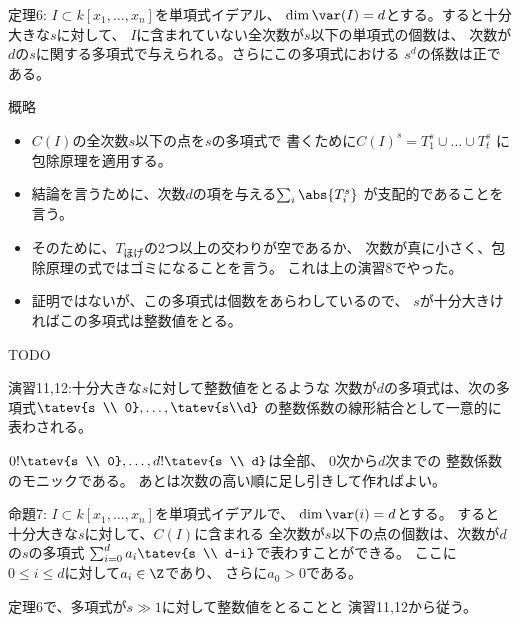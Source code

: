 \begin{framed}
  定理6:
  $I\subset k[x_1,\dots,x_n]$を単項式イデアル、
  $\dim \var(I) = d$とする。すると十分大きな$s$に対して、
  $I$に含まれていない全次数が$s$以下の単項式の個数は、
  次数が$d$の$s$に関する多項式で与えられる。さらにこの多項式における
  $s^d$の係数は正である。
\end{framed}
\begin{myproof}
  概略
  \begin{itemize}
    \item $C(I)$の全次数$s$以下の点を$s$の多項式で
    書くために$C(I)^s = T_1^s \cup \dots \cup T_t^s$
    に包除原理を適用する。
    \item 結論を言うために、次数$d$の項を与える$\sum_i \abs{T_i^s}$
    が支配的であることを言う。
    \item そのために、$T_{ほげ}$の2つ以上の交わりが空であるか、
    次数が真に小さく、包除原理の式ではゴミになることを言う。
    これは上の演習8でやった。
    \item 証明ではないが、この多項式は個数をあらわしているので、
    $s$が十分大きければこの多項式は整数値をとる。
  \end{itemize}

  TODO
\end{myproof}

\begin{framed}
  演習11,12:十分大きな$s$に対して整数値をとるような
  次数が$d$の多項式は、次の多項式$\tatev{s \\ 0},\dots,\tatev{s\\d}$
  の整数係数の線形結合として一意的に表わされる。
\end{framed}
\begin{myproof}
  $0! \tatev{s \\ 0},\dots, d! \tatev{s \\ d}$は全部、
  0次から$d$次までの
  整数係数のモニックである。
  あとは次数の高い順に足し引きして作ればよい。
\end{myproof}


\begin{framed}
  命題7:
  $I \subset k[x_1,\dots,x_n]$を単項式イデアルで、
  $\dim \var(i) = d$とする。
  すると十分大きな$s$に対して、$C(I)$に含まれる
  全次数が$s$以下の点の個数は、次数が$d$の$s$の多項式
  $\sum_{i=0}^d a_i \tatev{s \\ d-i}$で表わすことができる。
  ここに$0\le i\le d$に対して$a_i \in \Z$であり、
  さらに$a_0 > 0$である。
\end{framed}
\begin{myproof}
  定理6で、多項式が$s\gg 1$に対して整数値をとることと
  演習11,12から従う。
\end{myproof}

